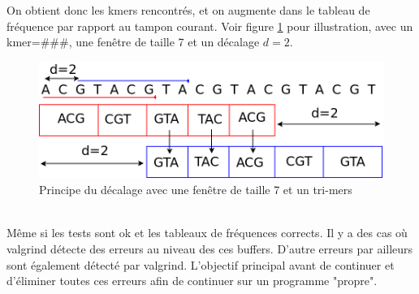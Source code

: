 On obtient donc les kmers rencontrés, et on augmente dans le tableau de fréquence par rapport au tampon courant. Voir figure \ref{decalage} pour illustration, avec un kmer=\#\#\#, une fenêtre de taille 7 et un décalage $d=2$.

\begin{figure}[H]
\begin{center}
\includegraphics[scale=0.4]{./../img/decalage.png}
\caption[Principe du décalage]{\label{decalage}Principe du décalage avec une fenêtre de taille 7 et un tri-mers}
\end{center}
\end{figure}
~\\

Même si les tests sont ok et les tableaux de fréquences corrects. Il y a des cas où valgrind détecte des erreurs au niveau des ces buffers. D'autre erreurs par ailleurs sont également détecté par valgrind. L'objectif principal avant de continuer et d'éliminer toutes ces erreurs afin de continuer sur un programme "propre".
